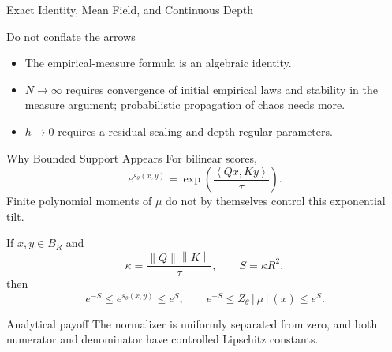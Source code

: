 \documentclass[aspectratio=169,11pt]{beamer}
\newcommand{\norm}[1]{\left\lVert#1\right\rVert}
\newcommand{\ip}[2]{\left\langle#1,#2\right\rangle}
\begin{document}
\begin{frame}{Exact Identity, Mean Field, and Continuous Depth}
\begin{center}
\end{center}

\begin{alertblock}{Do not conflate the arrows}
\begin{itemize}
\item The empirical-measure formula is an algebraic identity.
\item $N\to\infty$ requires convergence of initial empirical laws and stability in the measure argument; probabilistic propagation of chaos needs more.
\item $h\to0$ requires a residual scaling and depth-regular parameters.
\end{itemize}
\end{alertblock}
\end{frame}


\begin{frame}{Why Bounded Support Appears}
For bilinear scores,
\[
 e^{s_\theta(x,y)}
 =\exp\!\left(\frac{\ip{Qx}{Ky}}{\tau}\right).
\]
Finite polynomial moments of $\mu$ do not by themselves control this exponential tilt.

If $x,y\in B_R$ and
\[
 \kappa=\frac{\norm Q\norm K}{\tau},
 \qquad S=\kappa R^2,
\]
then
\[
 e^{-S}\le e^{s_\theta(x,y)}\le e^S,
 \qquad
 e^{-S}\le Z_\theta[\mu](x)\le e^S.
\]

\begin{block}{Analytical payoff}
The normalizer is uniformly separated from zero, and both numerator and denominator have controlled Lipschitz constants.
\end{block}
\end{frame}
\end{document}
